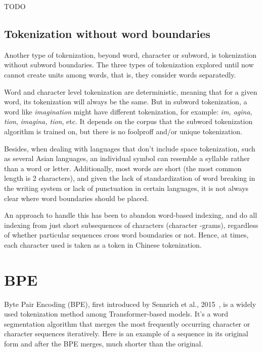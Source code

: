 TODO

\subsection{Tokenization without word boundaries}\label{subsec:wordtokwowb}

Another type of tokenization, beyond word, character or subword, is tokenization without subword boundaries. The three types of tokenization explored until now cannot create units among words, that is, they consider words separatedly.

Word and character level tokenization are deterministic, meaning that for a given word, its tokenization will always be the same. But in subword tokenization, a word like \emph{imagination} might have different tokenization, for example: \emph{im, agina, tion}, \emph{imagina, tion}, etc. It depends on the corpus that the subword tokenization algorithm is trained on, but there is no foolproff and/or unique tokenization.

Besides, when dealing with languages that don't include space tokenization, such as several Asian languages, an individual symbol can resemble a syllable rather than a word or letter. Additionally, most words are short (the most common length is 2 characters), and given the lack of standardization of word breaking in the writing system or lack of punctuation in certain languages, it is not always clear where word boundaries should be placed.

An approach to handle this has been to abandon word-based indexing, and do all indexing from just short subsequences of characters (character -grams), regardless of whether particular sequences cross word boundaries or not. Hence, at times, each character used is taken as a token in Chinese tokenization.

\section{BPE}

Byte Pair Encoding (BPE), first introduced by Sennrich et al., 2015~\cite{sennrich2015neural}, is a widely used tokenization method among Transformer-based models. It's a word segmentation algorithm that merges the most frequently occurring character or character sequences iteratively. Here is an example of a sequence in its original form and after the BPE merges, much shorter than the original.

